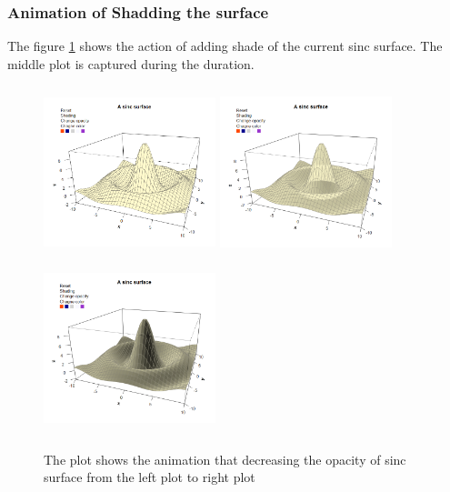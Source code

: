 \documentclass[paper=a4, fontsize=11pt]{report}
\begin{document}
\subsubsection*{Animation of Shadding the surface}
The figure \ref{Example_6.3.3} shows the action of adding shade of the current sinc surface. The middle plot is captured during the duration.
\begin{figure}[h]
\begin{center}
  \includegraphics[height = 5cm, width = 5cm]{figure/svg/origin_1.PNG}
  \includegraphics[height = 5cm, width = 5cm]{figure/svg/Shade_2.PNG}
  \includegraphics[height = 5cm, width = 5cm]{figure/svg/Shade_3.PNG}
  \caption{The plot shows the animation that decreasing the opacity of sinc surface from the left plot to right plot}
  	\label{Example_6.3.3}
\end{center}
\end{figure}
\end{document}
